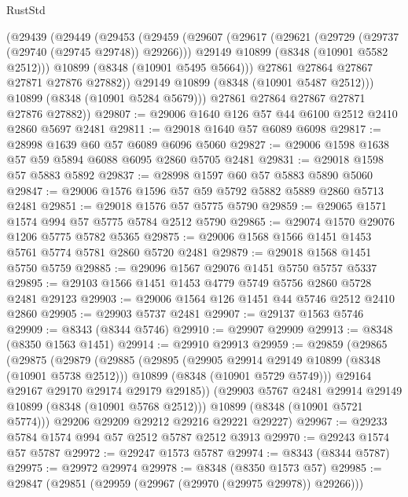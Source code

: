 \begin{lexlean}{RustStd}
\begin{coremodule}
        (@29439
          (@29449
            (@29453
              (@29459
                (@29607
                  (@29617
                    (@29621 (@29729 (@29737 (@29740 (@29745 @29748)) @29266)))
                    @29149
                    @10899
                    (@8348 (@10901 @5582 @2512)))
                  @10899
                  (@8348 (@10901 @5495 @5664)))
                @27861
                @27864
                @27867
                @27871
                @27876
                @27882))
            @29149
            @10899
            (@8348 (@10901 @5487 @2512)))
          @10899
          (@8348 (@10901 @5284 @5679)))
        @27861
        @27864
        @27867
        @27871
        @27876
        @27882))
@29807 := @29006 @1640 @126 @57 @44 @6100 @2512 @2410 @2860 @5697 @2481
@29811 := @29018 @1640 @57 @6089 @6098
@29817 := @28998 @1639 @60 @57 @6089 @6096 @5060
@29827 := @29006 @1598 @1638 @57 @59 @5894 @6088 @6095 @2860 @5705 @2481
@29831 := @29018 @1598 @57 @5883 @5892
@29837 := @28998 @1597 @60 @57 @5883 @5890 @5060
@29847 := @29006 @1576 @1596 @57 @59 @5792 @5882 @5889 @2860 @5713 @2481
@29851 := @29018 @1576 @57 @5775 @5790
@29859 := @29065 @1571 @1574 @994 @57 @5775 @5784 @2512 @5790
@29865 := @29074 @1570 @29076 @1206 @5775 @5782 @5365
@29875 := @29006 @1568 @1566 @1451 @1453 @5761 @5774 @5781 @2860 @5720 @2481
@29879 := @29018 @1568 @1451 @5750 @5759
@29885 := @29096 @1567 @29076 @1451 @5750 @5757 @5337
@29895 := @29103 @1566 @1451 @1453 @4779 @5749 @5756 @2860 @5728 @2481 @29123
@29903 := @29006 @1564 @126 @1451 @44 @5746 @2512 @2410 @2860
@29905 := @29903 @5737 @2481
@29907 := @29137 @1563 @5746
@29909 := @8343 (@8344 @5746)
@29910 := @29907 @29909
@29913 := @8348 (@8350 @1563 @1451)
@29914 := @29910 @29913
@29959 := @29859
    (@29865
      (@29875
        (@29879
          (@29885
            (@29895
              (@29905 @29914 @29149 @10899 (@8348 (@10901 @5738 @2512)))
              @10899
              (@8348 (@10901 @5729 @5749)))
            @29164
            @29167
            @29170
            @29174
            @29179
            @29185))
        (@29903 @5767 @2481 @29914 @29149 @10899 (@8348 (@10901 @5768 @2512)))
        @10899
        (@8348 (@10901 @5721 @5774)))
      @29206
      @29209
      @29212
      @29216
      @29221
      @29227)
@29967 := @29233 @5784 @1574 @994 @57 @2512 @5787 @2512 @3913
@29970 := @29243 @1574 @57 @5787
@29972 := @29247 @1573 @5787
@29974 := @8343 (@8344 @5787)
@29975 := @29972 @29974
@29978 := @8348 (@8350 @1573 @57)
@29985 := @29847 (@29851 (@29959 (@29967 (@29970 (@29975 @29978)) @29266)))

\end{coremodule}
\end{lexlean}
